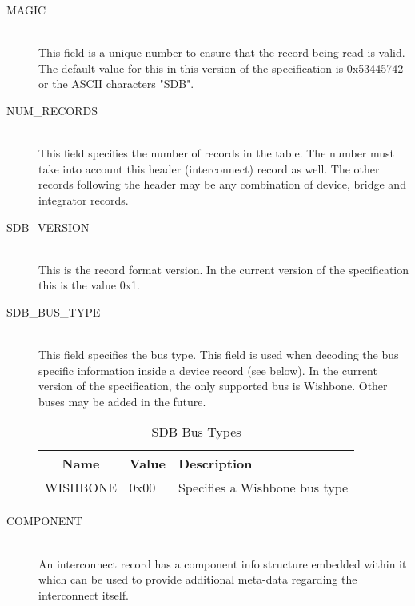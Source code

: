 \documentclass[a4paper, 12pt]{article}
\begin{document}
\begin{description}
\item[MAGIC] \hfill \\
This field is a unique number to ensure that the record being read is valid. The default
value for this in this version of the specification is 0x53445742 or the ASCII characters
"SDB".

\item[NUM\_RECORDS] \hfill \\
This field specifies the number of records in the table. The number must take into account
this header (interconnect) record as well. The other records following the header may be
any combination of device, bridge and integrator records.

\item[SDB\_VERSION] \hfill \\
This is the record format version. In the current version of the specification this is the
value 0x1.

\item[SDB\_BUS\_TYPE] \hfill \\
This field specifies the bus type. This field is used when decoding the bus specific information
inside a device record (see below). In the current version of the specification, the only
supported bus is Wishbone. Other buses may be added in the future.

\begin{center}
  \begin{savenotes}
    \begin{table}[!ht]\footnotesize
      \caption{SDB Bus Types}\label{bus_type}\centering
        \begin{tabular}{| c | l | p{5cm} |} \hline
        Name & Value & Description \\ \hline
        WISHBONE & 0x00 & Specifies a Wishbone bus type \\ \hline
        \end{tabular}
    \end{table}
  \end{savenotes}
\end{center}

\item[COMPONENT] \hfill \\
An interconnect record has a component info structure embedded within it which can be used
to provide additional meta-data regarding the interconnect itself.
\end{description}
\end{document}
